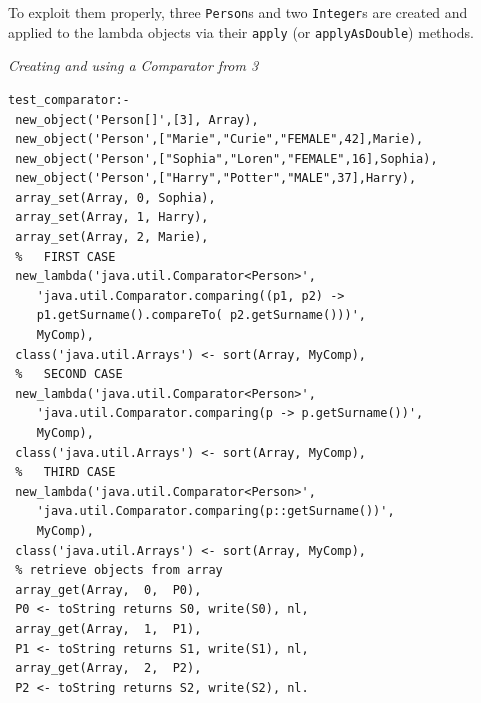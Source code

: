 To exploit them properly, three \texttt{Person}s and two \texttt{Integer}s are created and applied to the lambda objects via their \texttt{apply} (or \texttt{applyAsDouble}) methods.

\begin{table} %
\caption{\emph{Creating and using a Comparator from \tuprolog{} 3}}
{}
\begin{lstlisting}[language=tuProlog,
	caption={},
	label={tab:lambda-Comp-ex}]
test_comparator:-
 new_object('Person[]',[3], Array),
 new_object('Person',["Marie","Curie","FEMALE",42],Marie),
 new_object('Person',["Sophia","Loren","FEMALE",16],Sophia),
 new_object('Person',["Harry","Potter","MALE",37],Harry),
 array_set(Array, 0, Sophia),
 array_set(Array, 1, Harry),
 array_set(Array, 2, Marie),
 %   FIRST CASE
 new_lambda('java.util.Comparator<Person>',
	'java.util.Comparator.comparing((p1, p2) ->
	p1.getSurname().compareTo( p2.getSurname()))',
	MyComp),
 class('java.util.Arrays') <- sort(Array, MyComp),
 %   SECOND CASE
 new_lambda('java.util.Comparator<Person>',
	'java.util.Comparator.comparing(p -> p.getSurname())',
	MyComp),
 class('java.util.Arrays') <- sort(Array, MyComp),
 %   THIRD CASE
 new_lambda('java.util.Comparator<Person>',
	'java.util.Comparator.comparing(p::getSurname())',
	MyComp),
 class('java.util.Arrays') <- sort(Array, MyComp),
 % retrieve objects from array
 array_get(Array,  0,  P0),
 P0 <- toString returns S0, write(S0), nl,
 array_get(Array,  1,  P1),
 P1 <- toString returns S1, write(S1), nl,
 array_get(Array,  2,  P2),
 P2 <- toString returns S2, write(S2), nl.
\end{lstlisting}
\end{table}

